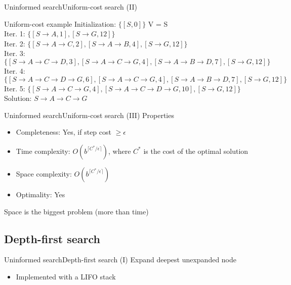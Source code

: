 \documentclass[10pt,compress]{beamer} %
\begin{document}
\begin{frame}[fragile]{Uninformed search}{Uniform-cost search (II)}
    \begin{exampleblock}{Uniform-cost example}
    \small{
    Initialization: $\{[S, 0]\}$  V = S\\
    Iter. 1: $\{[S \rightarrow A, 1], [S \rightarrow G, 12]\}$\\
    Iter. 2: $\{[S \rightarrow A \rightarrow C, 2], [S \rightarrow A \rightarrow B, 4], [S \rightarrow G, 12]\}$\\
    Iter. 3: $\{[S \rightarrow A \rightarrow C \rightarrow D, 3], [S \rightarrow A \rightarrow C \rightarrow G, 4], [S \rightarrow A \rightarrow B \rightarrow D, 7], [S \rightarrow G, 12]\}$\\
    Iter. 4: $\{[S \rightarrow A \rightarrow C \rightarrow D \rightarrow G, 6], [S \rightarrow A \rightarrow C \rightarrow G, 4], [S \rightarrow A \rightarrow B \rightarrow D, 7], [S \rightarrow G, 12]\}$\\
    Iter. 5: $\{[S \rightarrow A \rightarrow C \rightarrow G, 4], [S \rightarrow A \rightarrow C \rightarrow D \rightarrow G, 10], [S \rightarrow G, 12]\}$\\
    Solution: $S \rightarrow A \rightarrow C \rightarrow G$\\
    }
    \end{exampleblock}
\end{frame}

\begin{frame}[fragile]{Uninformed search}{Uniform-cost search (III)}
      Properties
      \begin{itemize}
        \item Completeness: Yes, if step cost $\ge\epsilon$
        \item Time complexity: $O(b^{\lceil C^{*}/\epsilon \rceil})$, where $C^{*}$ is the cost of the optimal solution
        \item Space complexity: $O(b^{\lceil C^{*}/\epsilon \rceil})$
        \item Optimality: Yes
      \end{itemize}
      Space is the biggest problem (more than time)
\end{frame}

\subsection{Depth-first search}

\begin{frame}{Uninformed search}{Depth-first search (I)}
    Expand deepest unexpanded node
    \begin{itemize}
        \item Implemented with a LIFO stack
    \end{itemize}
\end{frame}
\end{document}
